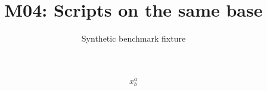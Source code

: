 \documentclass{article}
\title{M04: Scripts on the same base}
\author{Synthetic benchmark fixture}
\date{}
\begin{document}
\maketitle
\[x^a_b\]
\end{document}
